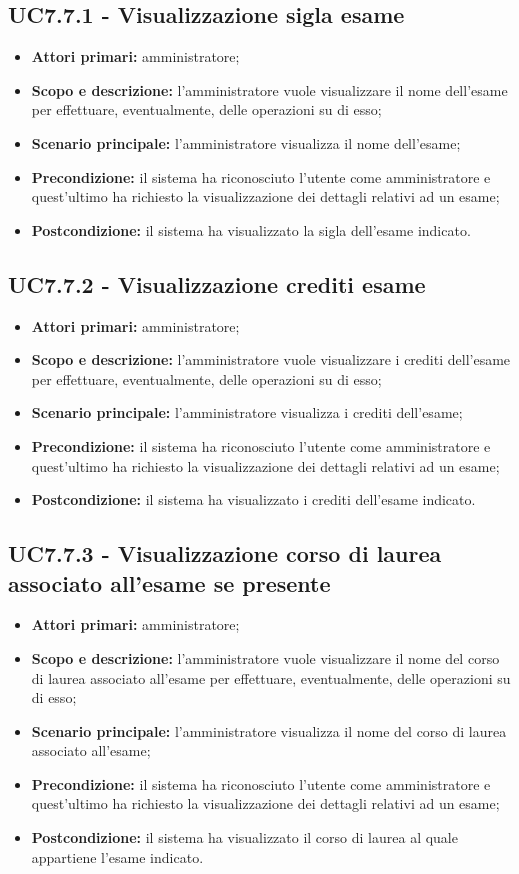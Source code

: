 \documentclass[AnalisiDeiRequisiti.tex]{subfiles}
\begin{document}
\subsection{UC7.7.1 - Visualizzazione sigla esame}
\begin{itemize}
	\item \textbf{Attori primari:} amministratore;
	\item \textbf{Scopo e descrizione:} l'amministratore vuole visualizzare il nome dell'esame per effettuare, eventualmente, delle operazioni su di esso;
	\item \textbf{Scenario principale:} l'amministratore visualizza il nome dell'esame;
	\item \textbf{Precondizione:} il sistema ha riconosciuto l'utente come amministratore e quest'ultimo ha richiesto la visualizzazione dei dettagli relativi ad un esame; 
	\item \textbf{Postcondizione:} il sistema ha visualizzato la sigla dell'esame indicato.
\end{itemize}
\subsection{UC7.7.2 - Visualizzazione crediti esame}
\begin{itemize}
	\item \textbf{Attori primari:} amministratore;
	\item \textbf{Scopo e descrizione:} l'amministratore vuole visualizzare i crediti dell'esame per effettuare, eventualmente, delle operazioni su di esso;
	\item \textbf{Scenario principale:} l'amministratore visualizza i crediti dell'esame;
	\item \textbf{Precondizione:} il sistema ha riconosciuto l'utente come amministratore e quest'ultimo ha richiesto la visualizzazione dei dettagli relativi ad un esame; 
	\item \textbf{Postcondizione:} il sistema ha visualizzato i crediti dell'esame indicato.
\end{itemize}
\subsection{UC7.7.3 - Visualizzazione corso di laurea associato all'esame se presente}
\begin{itemize}
	\item \textbf{Attori primari:} amministratore;
	\item \textbf{Scopo e descrizione:} l'amministratore vuole visualizzare il nome del corso di laurea associato all'esame per effettuare, eventualmente, delle operazioni su di esso;
	\item \textbf{Scenario principale:} l'amministratore visualizza il nome del corso di laurea associato all'esame;
	\item \textbf{Precondizione:} il sistema ha riconosciuto l'utente come amministratore e quest'ultimo ha richiesto la visualizzazione dei dettagli relativi ad un esame; 
	\item \textbf{Postcondizione:} il sistema ha visualizzato il corso di laurea al quale appartiene l'esame indicato.
\end{itemize}
\end{document}
